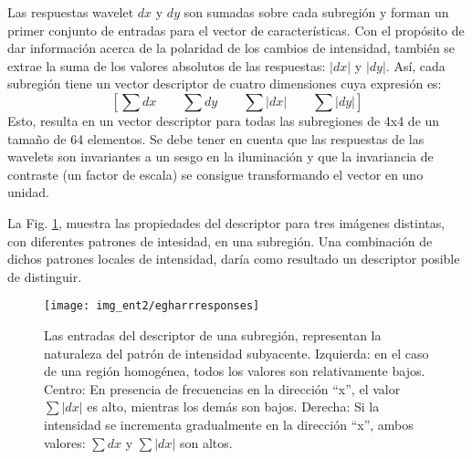 \documentclass[a4paper,11pt,spanish]{article}
\begin{document}
Las respuestas wavelet $dx$ y $dy$ son sumadas sobre cada subregión y forman un primer conjunto de entradas para el vector de características. Con el propósito de dar información acerca de la polaridad de los cambios de intensidad, también se extrae la suma de los valores absolutos de las respuestas: $\left|dx\right|$ y $\left|dy\right|$. Así, cada subregión tiene un vector descriptor de cuatro dimensiones cuya expresión es: 
\begin{equation}
\left[\sum dx\qquad\sum dy\qquad\sum \left|dx\right|\qquad\sum \left|dy\right|\right]
\label{equation_suma} 
\end{equation} 
Esto, resulta en un vector descriptor para todas las subregiones de 4x4 de un tamaño de 64 elementos. Se debe tener en cuenta que las respuestas de las wavelets son invariantes a un sesgo en la iluminación y que la invariancia de contraste (un factor de escala) se consigue transformando el vector en uno unidad.



La Fig. \ref{respuesta_descriptor}, muestra las propiedades del descriptor para tres imágenes distintas, con diferentes patrones de intesidad, en una subregión. Una combinación de dichos patrones locales de intensidad, daría como resultado un descriptor posible de distinguir.

\begin{figure}[tbhp]
   \centering
        \texttt{[image: img\_ent2/egharrresponses]}
    \caption{Las entradas del descriptor de una subregión, representan la naturaleza del patrón de intensidad subyacente. Izquierda: en el caso de una región homogénea, todos los valores son relativamente bajos. Centro: En presencia de frecuencias en la dirección ``x'', el valor $\sum \left|dx\right|$ es alto, mientras los demás son bajos. Derecha: Si la intensidad se incrementa gradualmente en la dirección ``x'', ambos valores: $\sum dx$ y $\sum \left|dx\right|$ son altos.}
   \label{respuesta_descriptor}                %
\end{figure}


\end{document}
